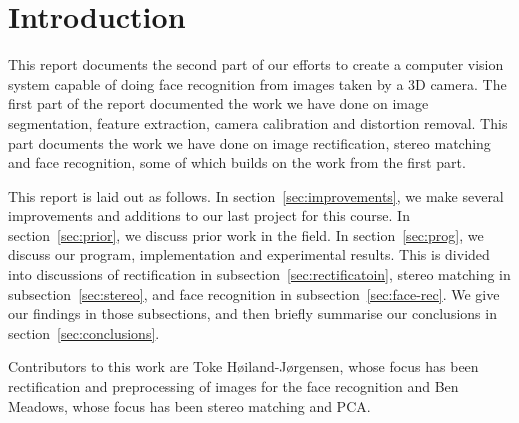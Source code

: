 
\section{Introduction}
This report documents the second part of our efforts to create a computer vision
system capable of doing face recognition from images taken by a 3D camera. The
first part of the report documented the work we have done on image segmentation,
feature extraction, camera calibration and distortion removal. This part
documents the work we have done on image rectification, stereo matching and face
recognition, some of which builds on the work from the first part.

This report is laid out as follows. In section~\ref{sec:improvements}, we make
several improvements and additions to our last project for this course. In
section~\ref{sec:prior}, we discuss prior work in the field. In
section~\ref{sec:prog}, we discuss our program, implementation and experimental
results. This is divided into discussions of rectification in
subsection~\ref{sec:rectificatoin}, stereo matching in
subsection~\ref{sec:stereo}, and face recognition in
subsection~\ref{sec:face-rec}. We give our findings in those subsections, and
then briefly summarise our conclusions in section~\ref{sec:conclusions}.

Contributors to this work are Toke Høiland-Jørgensen, whose focus has been
rectification and preprocessing of images for the face recognition and
Ben Meadows, whose focus has been stereo matching and PCA.
